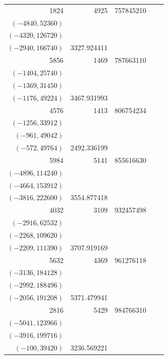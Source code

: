\documentclass[11pt]{article}
\begin{document}
\begin{longtable}{r r r l r}
1824 & 4925 & 757845210 & \begin{tabular}[t]{@{}l@{}}$(-4900,28700)$\\$(-4840,52360)$\\$(-4320,126720)$\\$(-2940,166740)$\end{tabular} & 3327.924411\\[5pt]
5856 & 1469 & 787663110 & \begin{tabular}[t]{@{}l@{}}$(-1464,7320)$\\$(-1404,25740)$\\$(-1369,31450)$\\$(-1176,49224)$\end{tabular} & 3467.931993\\[5pt]
4576 & 1413 & 806754234 & \begin{tabular}[t]{@{}l@{}}$(-1300,29380)$\\$(-1256,33912)$\\$(-961,49042)$\\$(-572,49764)$\end{tabular} & 2492.336199\\[5pt]
5984 & 5141 & 855616630 & \begin{tabular}[t]{@{}l@{}}$(-5041,74550)$\\$(-4896,114240)$\\$(-4664,153912)$\\$(-3816,222600)$\end{tabular} & 3554.877418\\[5pt]
4032 & 3109 & 932457498 & \begin{tabular}[t]{@{}l@{}}$(-3072,28416)$\\$(-2916,62532)$\\$(-2268,109620)$\\$(-2209,111390)$\end{tabular} & 3707.919169\\[5pt]
5632 & 4369 & 961276118 & \begin{tabular}[t]{@{}l@{}}$(-4232,75624)$\\$(-3136,184128)$\\$(-2992,188496)$\\$(-2056,191208)$\end{tabular} & 5371.479941\\[5pt]
2816 & 5429 & 984766310 & \begin{tabular}[t]{@{}l@{}}$(-5184,100800)$\\$(-5041,123966)$\\$(-3916,199716)$\\$(-100,39420)$\end{tabular} & 3236.569221\\[5pt]

\end{longtable}
\end{document}
